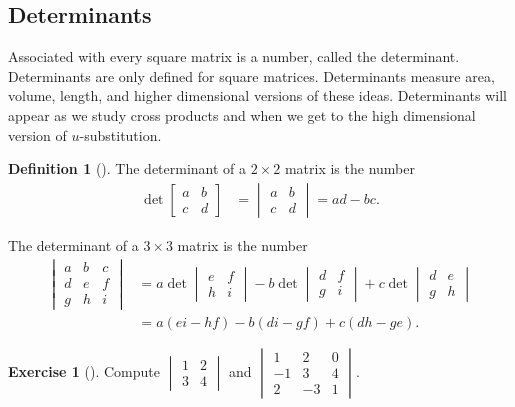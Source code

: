 \documentclass[10pt,]{book}
\theoremstyle{plain}
\theoremstyle{definition}
\newtheorem{definition}[theorem]{Definition}
\theoremstyle{definition}
\theoremstyle{definition}
\theoremstyle{definition}
\newtheorem{exploration}[project]{Exercise}
\theoremstyle{definition}
\numberwithin{equation}{section}
\newcommand{\amp}{&}
\begin{document}
\subsection[{Determinants}]{Determinants}\label{sec_Determinants}
Associated with every square matrix is a number, called the determinant. Determinants are only defined for square matrices. Determinants measure area, volume, length, and higher dimensional versions of these ideas. Determinants will appear as we study cross products and when we get to the high dimensional version of {\(u\)}-substitution.%
\begin{definition}[{}]\label{definition-9}
The determinant of a {\(2\times 2\)} matrix is the number %
\begin{align*}
\det\begin{bmatrix}a\amp b\\
c\amp d\end{bmatrix} \amp =\begin{vmatrix}a\amp b\\
c\amp d\end{vmatrix} = ad-bc.
\end{align*}
%
\par
The determinant of a {\(3\times 3\)} matrix is the number %
\begin{align*}
\begin{vmatrix}a\amp b\amp c\\
d\amp e\amp f\\
g\amp h\amp i\end{vmatrix} \amp = a\det\begin{vmatrix}e\amp f\\
h\amp i\end{vmatrix} -b\det\begin{vmatrix}d\amp f\\
g\amp i\end{vmatrix} +c\det\begin{vmatrix}d\amp e\\
g\amp h\end{vmatrix}\\
\amp =a(ei-hf)-b(di-gf)+c(dh-ge).
\end{align*}
%
\end{definition}
\begin{exploration}[]\label{exploration-39}
Compute \(\begin{vmatrix}
1\amp 2\\
3\amp 4
\end{vmatrix}\) and \(\begin{vmatrix}
1\amp 2\amp 0\\
-1\amp 3\amp 4\\
2\amp -3\amp 1
\end{vmatrix}\).%
\end{exploration}
\end{document}
